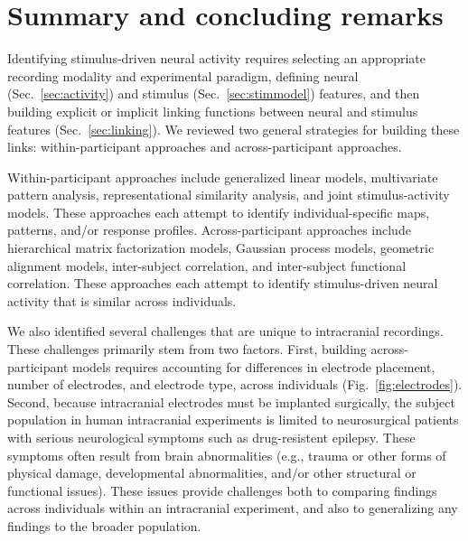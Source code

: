 \documentclass{llmxive}
\begin{document}
\section{Summary and concluding remarks}
Identifying stimulus-driven neural activity requires selecting an
appropriate recording modality and experimental paradigm, defining
neural (Sec.~\ref{sec:activity}) and stimulus
(Sec.~\ref{sec:stimmodel}) features, and then building explicit or
implicit linking functions between neural and stimulus features
(Sec.~\ref{sec:linking}).  We reviewed two general strategies for
building these links: within-participant approaches and
across-participant approaches.

Within-participant approaches include generalized linear models,
multivariate pattern analysis, representational similarity analysis,
and joint stimulus-activity models.  These approaches each attempt to
identify individual-specific maps, patterns, and/or response
profiles.  Across-participant approaches include hierarchical matrix
factorization models, Gaussian process models, geometric alignment
models, inter-subject correlation, and inter-subject functional
correlation.  These approaches each attempt to identify
stimulus-driven neural activity that is similar across individuals.

We also identified several challenges that are unique to intracranial
recordings.  These challenges primarily stem from two factors.  First,
building across-participant models requires accounting for differences
in electrode placement, number of electrodes, and electrode type,
across individuals (Fig.~\ref{fig:electrodes}).  Second, because
intracranial electrodes must be implanted surgically, the subject
population in human intracranial experiments is limited to
neurosurgical patients with serious neurological symptoms such as
drug-resistent epilepsy.  These symptoms often result from brain
abnormalities (e.g., trauma or other forms of physical damage, developmental
abnormalities, and/or other structural or functional issues).  These
issues provide challenges both to comparing findings across
individuals within an intracranial experiment, and also to
generalizing any findings to the broader population.
\end{document}
